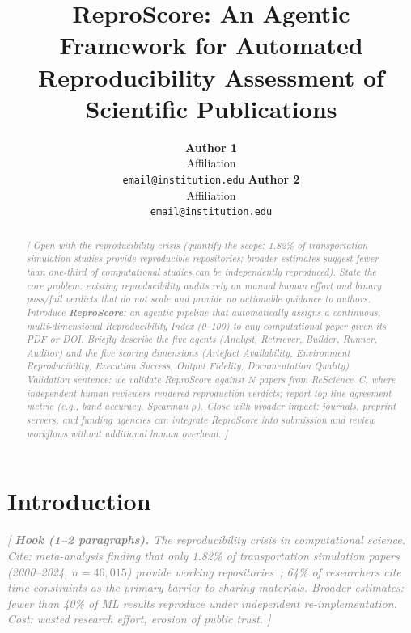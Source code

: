 \documentclass{article}
\title{ReproScore: An Agentic Framework for Automated\\
       Reproducibility Assessment of Scientific Publications}
\author{%
  \textbf{Author 1} \\
  Affiliation \\
  \texttt{email@institution.edu}
  \And
  \textbf{Author 2} \\
  Affiliation \\
  \texttt{email@institution.edu}
}
\newcommand{\outline}[1]{\textcolor{gray}{\textit{[#1]}}}
\newcommand{\N}{$N$}
\begin{document}
\maketitle

\begin{abstract}
\outline{%
  Open with the reproducibility crisis (quantify the scope: 1.82\% of
  transportation simulation studies provide reproducible repositories;
  broader estimates suggest fewer than one-third of computational studies
  can be independently reproduced).
  State the core problem: existing reproducibility audits rely on manual
  human effort and binary pass/fail verdicts that do not scale and provide
  no actionable guidance to authors.
  Introduce \textbf{ReproScore}: an agentic pipeline that automatically
  assigns a continuous, multi-dimensional Reproducibility Index (0--100)
  to any computational paper given its PDF or DOI.
  Briefly describe the five agents (Analyst, Retriever, Builder, Runner,
  Auditor) and the five scoring dimensions (Artefact Availability,
  Environment Reproducibility, Execution Success, Output Fidelity,
  Documentation Quality).
  Validation sentence: we validate ReproScore against \N{} papers from
  ReScience~C, where independent human reviewers rendered reproduction
  verdicts; report top-line agreement metric (e.g., band accuracy,
  Spearman $\rho$).
  Close with broader impact: journals, preprint servers, and funding
  agencies can integrate ReproScore into submission and review workflows
  without additional human overhead.
}
\end{abstract}

\section{Introduction}
\label{sec:intro}

\outline{%
  \textbf{Hook (1--2 paragraphs).}
  The reproducibility crisis in computational science.
  Cite: meta-analysis finding that only 1.82\% of transportation
  simulation papers (2000--2024, $n = 46{,}015$) provide working
  repositories~\cite{riehl2025}; 64\% of researchers cite time
  constraints as the primary barrier to sharing materials.
  Broader estimates: fewer than 40\% of ML results reproduce under
  independent re-implementation.
  Cost: wasted research effort, erosion of public trust.
}
\end{document}
